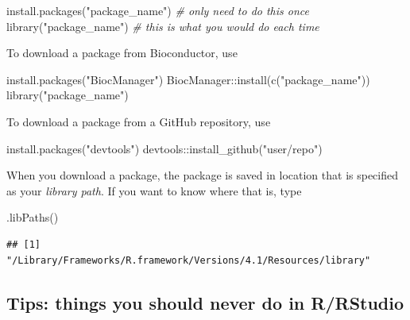 \documentclass[
]{book}
\newenvironment{Shaded}{\begin{snugshade}}{\end{snugshade}}
\newcommand{\CommentTok}[1]{\textcolor[rgb]{0.56,0.35,0.01}{\textit{#1}}}
\newcommand{\FunctionTok}[1]{\textcolor[rgb]{0.00,0.00,0.00}{#1}}
\newcommand{\NormalTok}[1]{#1}
\newcommand{\SpecialCharTok}[1]{\textcolor[rgb]{0.00,0.00,0.00}{#1}}
\newcommand{\StringTok}[1]{\textcolor[rgb]{0.31,0.60,0.02}{#1}}
\begin{document}
\begin{Shaded}
\begin{Highlighting}[]
\FunctionTok{install.packages}\NormalTok{(}\StringTok{"package\_name"}\NormalTok{) }\CommentTok{\# only need to do this once }
\FunctionTok{library}\NormalTok{(}\StringTok{"package\_name"}\NormalTok{) }\CommentTok{\# this is what you would do each time }
\end{Highlighting}
\end{Shaded}

To download a package from Bioconductor, use

\begin{Shaded}
\begin{Highlighting}[]
\FunctionTok{install.packages}\NormalTok{(}\StringTok{"BiocManager"}\NormalTok{) }
\NormalTok{BiocManager}\SpecialCharTok{::}\FunctionTok{install}\NormalTok{(}\FunctionTok{c}\NormalTok{(}\StringTok{"package\_name"}\NormalTok{))}
\FunctionTok{library}\NormalTok{(}\StringTok{"package\_name"}\NormalTok{)}
\end{Highlighting}
\end{Shaded}

To download a package from a GitHub repository, use

\begin{Shaded}
\begin{Highlighting}[]
\FunctionTok{install.packages}\NormalTok{(}\StringTok{"devtools"}\NormalTok{)}
\NormalTok{devtools}\SpecialCharTok{::}\FunctionTok{install\_github}\NormalTok{(}\StringTok{"user/repo"}\NormalTok{)}
\end{Highlighting}
\end{Shaded}

When you download a package, the package is saved in location that is specified as your \emph{library path}. If you want to know where that is, type

\begin{Shaded}
\begin{Highlighting}[]
\FunctionTok{.libPaths}\NormalTok{()}
\end{Highlighting}
\end{Shaded}

\begin{verbatim}
## [1] "/Library/Frameworks/R.framework/Versions/4.1/Resources/library"
\end{verbatim}

\hypertarget{tips-things-you-should-never-do-in-rrstudio}{%
\subsection{Tips: things you should never do in R/RStudio}\label{tips-things-you-should-never-do-in-rrstudio}}
\end{document}
